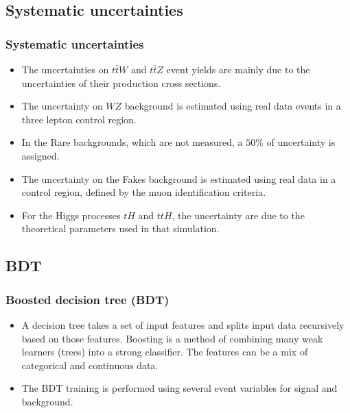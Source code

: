 \documentclass[11pt]{beamer}
\begin{document}
\begin{frame}
\subsection{Systematic uncertainties}
\frametitle{Systematic uncertainties}
\begin{itemize}
	\item The uncertainties on $t\bar{t}W$ and $t\bar{t}Z$ event yields are mainly due to the uncertainties of their production cross sections. 
	\item The uncertainty on $WZ$ background is estimated using real data events in a three lepton control region. 
	\item In the Rare backgrounds, which are not measured, a $50\%$ of uncertainty is assigned.
	\item The uncertainty on the Fakes background is estimated using real data in a control region, defined by the muon identification criteria. 
	\item For the Higgs processes $tH$ and $ttH$, the uncertainty are due to the theoretical parameters used in that simulation.
\end{itemize}

\end{frame}
\begin{frame}
\subsection{BDT}
\frametitle{Boosted decision tree (BDT)}
\begin{itemize}
\item A decision tree takes a set of input features and splits input data recursively based on
those features.
Boosting is a method of combining many weak learners (trees) into a strong classifier. The features can be a mix of categorical and continuous data.
\item The BDT training is performed using several event variables for signal and background. 
\end{itemize}
\end{frame}
\end{document}
